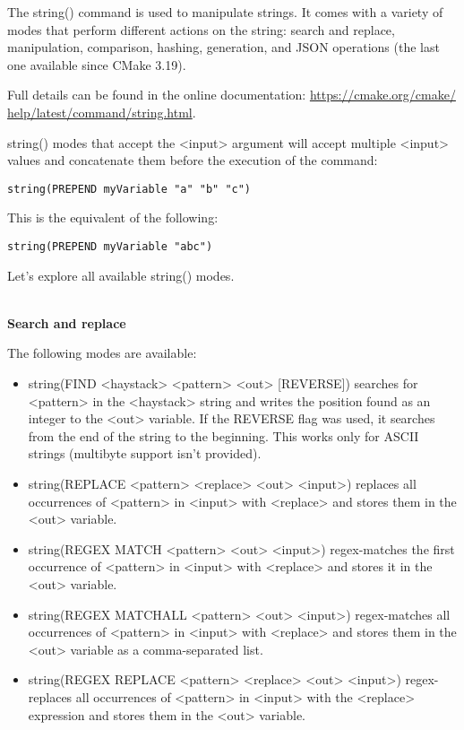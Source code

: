 The string() command is used to manipulate strings. It comes with a variety of modes that perform different actions on the string: search and replace, manipulation, comparison, hashing, generation, and JSON operations (the last one available since CMake 3.19).

Full details can be found in the online documentation: \url{https://cmake.org/cmake/ help/latest/command/string.html}.

string() modes that accept the <input> argument will accept multiple <input> values and concatenate them before the execution of the command:

\begin{lstlisting}[style=styleCMake]
string(PREPEND myVariable "a" "b" "c")
\end{lstlisting}

This is the equivalent of the following:

\begin{lstlisting}[style=styleCMake]
string(PREPEND myVariable "abc")
\end{lstlisting}

Let's explore all available string() modes.

\hspace*{\fill} \\ %
\noindent
\textbf{Search and replace}

The following modes are available:

\begin{itemize}
\item 
string(FIND <haystack> <pattern> <out> [REVERSE]) searches for <pattern> in the <haystack> string and writes the position found as an integer to the <out> variable. If the REVERSE flag was used, it searches from the end of the string to the beginning. This works only for ASCII strings (multibyte support isn't provided).

\item 
string(REPLACE <pattern> <replace> <out> <input>) replaces all occurrences of <pattern> in <input> with <replace> and stores them in the <out> variable.

\item 
string(REGEX MATCH <pattern> <out> <input>) regex-matches the first occurrence of <pattern> in <input> with <replace> and stores it in the <out> variable.

\item 
string(REGEX MATCHALL <pattern> <out> <input>) regex-matches all occurrences of <pattern> in <input> with <replace> and stores them in the <out> variable as a comma-separated list.

\item
string(REGEX REPLACE <pattern> <replace> <out> <input>) regex-replaces all occurrences of <pattern> in <input> with the <replace> expression and stores them in the <out> variable.
\end{itemize}

